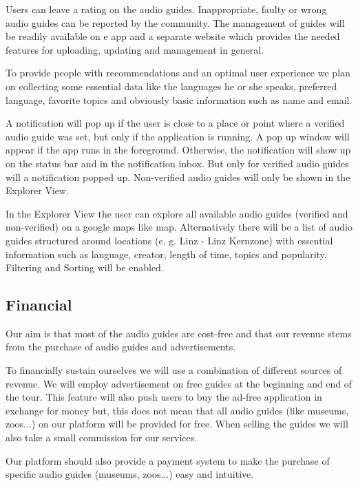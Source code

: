 \documentclass[12pt]{article}
\theoremstyle{definition}
\newenvironment{text}{
}{}
\begin{document}
\begin{text}
Users can leave a rating on the audio guides. Inappropriate, faulty or wrong audio guides can be reported by the community. The management of guides will be readily available on e app and a separate website which provides the needed features for uploading, updating and management in general.\newline

To provide people with recommendations and an optimal user experience we plan on collecting some essential data like the languages he or she speaks, preferred language, favorite topics and obviously basic information such as name and email.\newline
 
A notification will pop up if the user is close to a place or point where a verified audio guide was set, but only if the application is running. A pop up window will appear if the app runs in the foreground. Otherwise, the notification will show up on the status bar and in the notification inbox. But only for verified audio guides will a notification popped up. Non-verified audio guides will only be shown in the Explorer View.\newline
 
In the Explorer View the user can explore all available audio guides (verified and non-verified) on a google maps like map. Alternatively there will be a list of audio guides structured around locations (e. g. Linz - Linz Kernzone) with essential information such as language, creator, length of time, topics and popularity. Filtering and Sorting will be enabled.
\end{text}

\subsection{Financial}
\begin{text} 
Our aim is that most of the audio guides are cost-free and that our revenue stems from the purchase of audio guides and advertisements.\newline

To financially sustain ourselves we will use a combination of different sources of revenue. We will employ advertisement on free guides at the beginning and end of the tour. This feature will also push users to buy the ad-free application in exchange for money but, this does not mean that all audio guides (like museums, zoos...) on our platform will be provided for free. When selling the guides we will also take a small commission for our services.\newline

Our platform should also provide a payment system to make the purchase of specific audio guides (museums, zoos...) easy and intuitive. 
\end{text}
\end{document}
